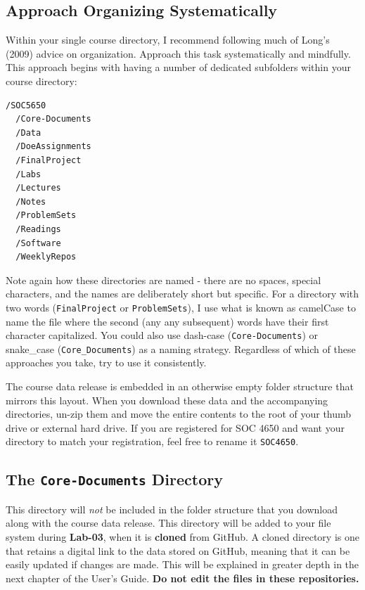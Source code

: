 \documentclass[]{book}
\begin{document}
\subsection{Approach Organizing
Systematically}\label{approach-organizing-systematically}

Within your single course directory, I recommend following much of
Long's (2009) advice on organization. Approach this task systematically
and mindfully. This approach begins with having a number of dedicated
subfolders within your course directory:

\begin{verbatim}
/SOC5650
  /Core-Documents
  /Data
  /DoeAssignments
  /FinalProject
  /Labs
  /Lectures
  /Notes
  /ProblemSets
  /Readings
  /Software
  /WeeklyRepos
\end{verbatim}

Note again how these directories are named - there are no spaces,
special characters, and the names are deliberately short but specific.
For a directory with two words (\texttt{FinalProject} or
\texttt{ProblemSets}), I use what is known as camelCase to name the file
where the second (any any subsequent) words have their first character
capitalized. You could also use dash-case (\texttt{Core-Documents}) or
snake\_case (\texttt{Core\_Documents}) as a naming strategy. Regardless
of which of these approaches you take, try to use it consistently.

The course data release is embedded in an otherwise empty folder
structure that mirrors this layout. When you download these data and the
accompanying directories, un-zip them and move the entire contents to
the root of your thumb drive or external hard drive. If you are
registered for SOC 4650 and want your directory to match your
registration, feel free to rename it \texttt{SOC4650}.

\subsection{\texorpdfstring{The \texttt{Core-Documents}
Directory}{The Core-Documents Directory}}\label{the-core-documents-directory}

This directory will \emph{not} be included in the folder structure that
you download along with the course data release. This directory will be
added to your file system during \textbf{Lab-03}, when it is
\textbf{cloned} from GitHub. A cloned directory is one that retains a
digital link to the data stored on GitHub, meaning that it can be easily
updated if changes are made. This will be explained in greater depth in
the next chapter of the User's Guide. \textbf{Do not edit the files in
these repositories.}
\end{document}

